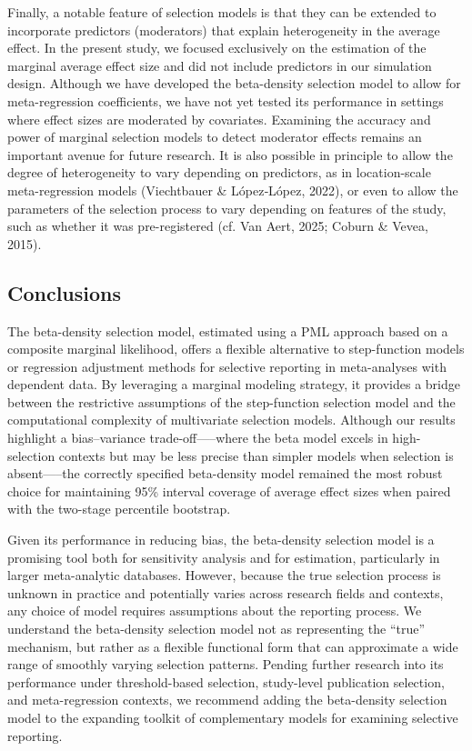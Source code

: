 \documentclass[
  american,
  man, donotrepeattitle,floatsintext]{apa7}
\begin{document}
Finally, a notable feature of selection models is that they can be extended to incorporate predictors (moderators) that explain heterogeneity in the average effect.
In the present study, we focused exclusively on the estimation of the marginal average effect size and did not include predictors in our simulation design.
Although we have developed the beta-density selection model to allow for meta-regression coefficients, we have not yet tested its performance in settings where effect sizes are moderated by covariates.
Examining the accuracy and power of marginal selection models to detect moderator effects remains an important avenue for future research.
It is also possible in principle to allow the degree of heterogeneity to vary depending on predictors, as in location-scale meta-regression models (Viechtbauer \& López‐López, 2022), or even to allow the parameters of the selection process to vary depending on features of the study, such as whether it was pre-registered (cf. Van Aert, 2025; Coburn \& Vevea, 2015).

\subsection{Conclusions}\label{conclusions}

The beta-density selection model, estimated using a PML approach based on a composite marginal likelihood, offers a flexible alternative to step-function models or regression adjustment methods for selective reporting in meta-analyses with dependent data.
By leveraging a marginal modeling strategy, it provides a bridge between the restrictive assumptions of the step-function selection model and the computational complexity of multivariate selection models.
Although our results highlight a bias--variance trade-off-----where the beta model excels in high-selection contexts but may be less precise than simpler models when selection is absent-----the correctly specified beta-density model remained the most robust choice for maintaining 95\% interval coverage of average effect sizes when paired with the two-stage percentile bootstrap.

Given its performance in reducing bias, the beta-density selection model is a promising tool both for sensitivity analysis and for estimation, particularly in larger meta-analytic databases.
However, because the true selection process is unknown in practice and potentially varies across research fields and contexts, any choice of model requires assumptions about the reporting process.
We understand the beta-density selection model not as representing the ``true'' mechanism, but rather as a flexible functional form that can approximate a wide range of smoothly varying selection patterns.
Pending further research into its performance under threshold-based selection, study-level publication selection, and meta-regression contexts, we recommend adding the beta-density selection model to the expanding toolkit of complementary models for examining selective reporting.
\end{document}
